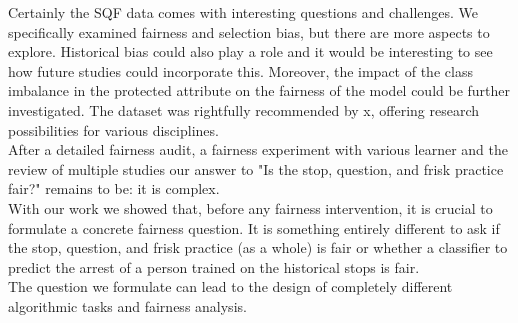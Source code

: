 

Certainly the SQF data comes with interesting questions and challenges. We specifically examined fairness and selection bias, but there are more aspects to explore. Historical bias could also play a role and it would be interesting to see how future studies could incorporate this. Moreover, the impact of the class imbalance in the protected attribute on the fairness of the model could be further investigated. The dataset was rightfully recommended by x, offering research possibilities for various disciplines.\\
After a detailed fairness audit, a fairness experiment with various learner and the review of multiple studies our answer to "Is the stop, question, and frisk practice fair?" remains to be: it is complex.\\
With our work we showed that, before any fairness intervention, it is crucial to formulate a concrete fairness question. It is something entirely different to ask if the stop, question, and frisk practice (as a whole) is fair or whether a classifier to predict the arrest of a person trained on the historical stops is fair.\\
The question we formulate can lead to the design of completely different algorithmic tasks and fairness analysis.


